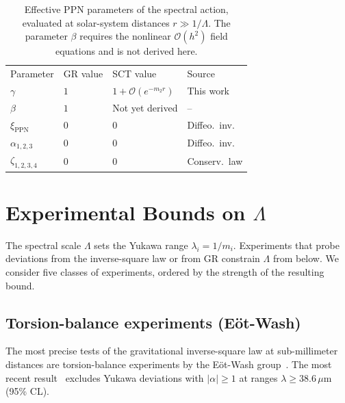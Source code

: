 \documentclass[aps,prd,twocolumn,superscriptaddress,nofootinbib,floatfix]{revtex4-2}
\newcommand{\order}{\mathcal{O}}
\begin{document}
\begin{table}[t]
\caption{Effective PPN parameters of the spectral action, evaluated at
solar-system distances $r \gg 1/\Lambda$.
The parameter $\beta$ requires the nonlinear
$\order(h^2)$ field equations and is not derived here.}
\label{tab:ppn}
\begin{ruledtabular}
\begin{tabular}{llll}
Parameter & GR value & SCT value & Source \\
\colrule
$\gamma$ & $1$ & $1 + \order(e^{-m_2 r})$ & This work \\
$\beta$ & $1$ & Not yet derived & -- \\
$\xi_\mathrm{PPN}$ & $0$ & $0$ & Diffeo.\ inv.\ \\
$\alpha_{1,2,3}$ & $0$ & $0$ & Diffeo.\ inv.\ \\
$\zeta_{1,2,3,4}$ & $0$ & $0$ & Conserv.\ law \\
\end{tabular}
\end{ruledtabular}
\end{table}


\section{Experimental Bounds on \texorpdfstring{$\Lambda$}{Lambda}}
\label{sec:bounds}

The spectral scale $\Lambda$ sets the Yukawa range
$\lambda_i = 1/m_i$. Experiments that probe deviations from the
inverse-square law or from GR constrain $\Lambda$ from below. We
consider five classes of experiments, ordered by the strength of the
resulting bound.

\subsection{Torsion-balance experiments (E\"ot-Wash)}

The most precise tests of the gravitational inverse-square law at
sub-millimeter distances are torsion-balance experiments by the
E\"ot-Wash group~\cite{Lee:2020,Kapner:2007,Adelberger:2009}.
The most recent result~\cite{Lee:2020} excludes Yukawa deviations with
$|\alpha| \geq 1$ at ranges $\lambda \geq 38.6\,\mu\mathrm{m}$ (95\%
CL).
\end{document}
